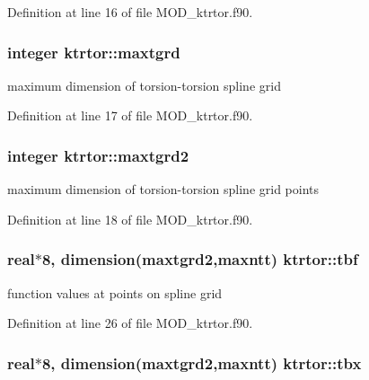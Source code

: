Definition at line 16 of file M\-O\-D\-\_\-ktrtor.\-f90.

\hypertarget{classktrtor_a5c2d655cdc848a5d23532dc079e23cc5}{
\subsubsection[{maxtgrd}]{\setlength{\rightskip}{0pt plus 5cm}integer ktrtor\-::maxtgrd}}\label{classktrtor_a5c2d655cdc848a5d23532dc079e23cc5}


maximum dimension of torsion-\/torsion spline grid 



Definition at line 17 of file M\-O\-D\-\_\-ktrtor.\-f90.

\hypertarget{classktrtor_a83f65d5a672e0c8e0cf9db285915243b}{
\subsubsection[{maxtgrd2}]{\setlength{\rightskip}{0pt plus 5cm}integer ktrtor\-::maxtgrd2}}\label{classktrtor_a83f65d5a672e0c8e0cf9db285915243b}


maximum dimension of torsion-\/torsion spline grid points 



Definition at line 18 of file M\-O\-D\-\_\-ktrtor.\-f90.

\hypertarget{classktrtor_a3e7fd2e1979b5b7e0f05fdddb5429b03}{
\subsubsection[{tbf}]{\setlength{\rightskip}{0pt plus 5cm}real$\ast$8, dimension({\bf maxtgrd2},{\bf maxntt}) ktrtor\-::tbf}}\label{classktrtor_a3e7fd2e1979b5b7e0f05fdddb5429b03}


function values at points on spline grid 



Definition at line 26 of file M\-O\-D\-\_\-ktrtor.\-f90.

\hypertarget{classktrtor_ad90617cead2c03c1b215f81cd359e88d}{
\subsubsection[{tbx}]{\setlength{\rightskip}{0pt plus 5cm}real$\ast$8, dimension({\bf maxtgrd2},{\bf maxntt}) ktrtor\-::tbx}}\label{classktrtor_ad90617cead2c03c1b215f81cd359e88d}



